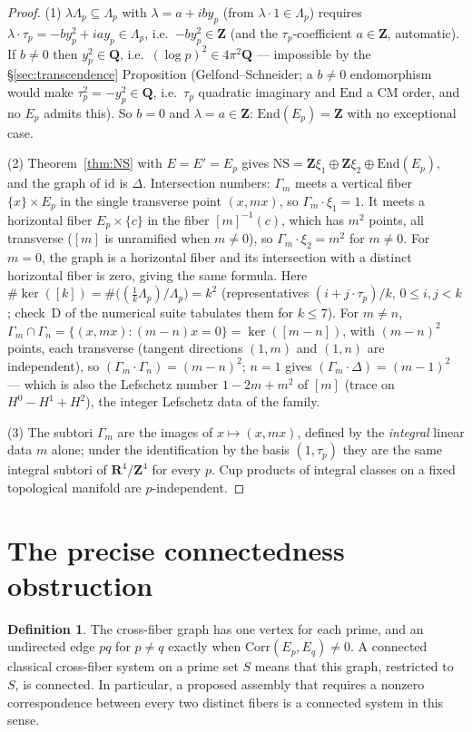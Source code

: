 \documentclass[11pt]{article}
\theoremstyle{definition}
\newtheorem{definition}{Definition}
\theoremstyle{remark}
\newcommand{\Z}{\mathbf{Z}}
\newcommand{\Q}{\mathbf{Q}}
\newcommand{\R}{\mathbf{R}}
\newcommand{\NS}{\mathrm{NS}}
\newcommand{\End}{\mathrm{End}}
\newcommand{\Corr}{\mathrm{Corr}}
\begin{document}
\begin{proof}
(1) $\lambda\Lambda_p \subseteq \Lambda_p$ with $\lambda = a + i b y_p$
(from $\lambda\cdot 1 \in \Lambda_p$) requires
$\lambda\cdot\tau_p = -b y_p^2 + i a y_p \in \Lambda_p$, i.e.\
$-b y_p^2 \in \Z$ (and the $\tau_p$-coefficient $a \in \Z$, automatic). If
$b \neq 0$ then $y_p^2 \in \Q$, i.e.\ $(\log p)^2 \in 4\pi^2\Q$ ---
impossible by the \S\ref{sec:transcendence} Proposition
(Gelfond--Schneider; a $b \neq 0$ endomorphism would make
$\tau_p^2 = -y_p^2 \in \Q$, i.e.\ $\tau_p$ quadratic imaginary and $\End$ a
CM order, and no $E_p$ admits this). So $b = 0$ and $\lambda = a \in \Z$:
$\End(E_p) = \Z$ with no exceptional case.

(2) Theorem~\ref{thm:NS} with $E = E' = E_p$ gives
$\NS = \Z\xi_1 \oplus \Z\xi_2 \oplus \End(E_p)$, and the graph of
$\mathrm{id}$ is $\Delta$. Intersection numbers: $\Gamma_m$ meets a vertical
fiber $\{x\}\times E_p$ in the single transverse point $(x, mx)$, so
$\Gamma_m\cdot\xi_1 = 1$. It meets a horizontal fiber $E_p\times\{c\}$ in
the fiber $[m]^{-1}(c)$, which has $m^2$ points, all transverse ($[m]$ is
unramified when $m\ne0$), so $\Gamma_m\cdot\xi_2 = m^2$ for $m\ne0$. For $m=0$, the graph is a horizontal fiber and its intersection with a distinct horizontal fiber is zero, giving the same formula. Here
$\#\ker([k]) = \#\bigl((\tfrac{1}{k}\Lambda_p)/\Lambda_p\bigr) = k^2$
(representatives $(i + j\cdot\tau_p)/k$, $0 \leq i, j < k$; check~D of the
numerical suite tabulates them for $k \leq 7$). For $m \neq n$,
$\Gamma_m \cap \Gamma_n = \{(x, mx) : (m-n)x = 0\} = \ker([m-n])$, with
$(m-n)^2$ points, each transverse (tangent directions $(1, m)$ and $(1, n)$
are independent), so $(\Gamma_m\cdot\Gamma_n) = (m-n)^2$; $n = 1$ gives
$(\Gamma_m\cdot\Delta) = (m-1)^2$ --- which is also the Lefschetz number
$1 - 2m + m^2$ of $[m]$ (trace on $H^0 - H^1 + H^2$), the integer Lefschetz
data of the family.

(3) The subtori $\Gamma_m$ are the images of $x \mapsto (x, mx)$, defined by
the \emph{integral} linear data $m$ alone; under the identification by the
basis $(1, \tau_p)$ they are the same integral subtori of $\R^4/\Z^4$ for
every $p$. Cup products of integral classes on a fixed topological manifold
are $p$-independent.
\end{proof}


\section{The precise connectedness obstruction}\label{sec:seed}
\begin{definition}
The cross-fiber graph has one vertex for each prime, and an undirected edge
$pq$ for $p\ne q$ exactly when $\Corr(E_p,E_q)\ne0$.
A connected classical cross-fiber system on a prime set $S$ means that this
graph, restricted to $S$, is connected. In particular, a proposed assembly
that requires a nonzero correspondence between every two distinct fibers
is a connected system in this sense.
\end{definition}
\end{document}
